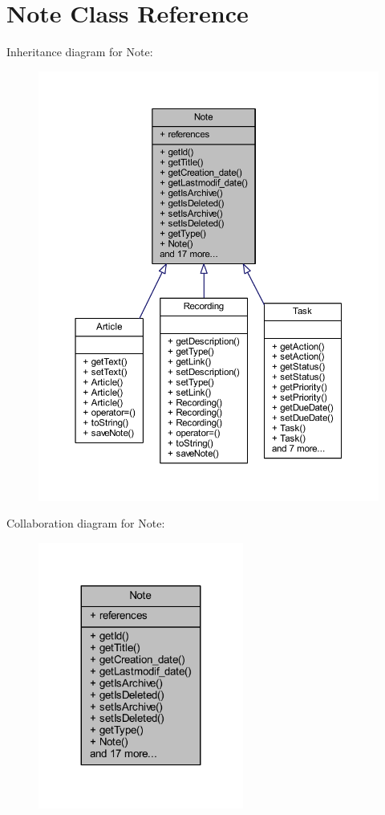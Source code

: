 \hypertarget{class_note}{}\section{Note Class Reference}
\label{class_note}


Inheritance diagram for Note\+:\nopagebreak
\begin{figure}[H]
\begin{center}
\leavevmode
\includegraphics[width=350pt]{class_note__inherit__graph}
\end{center}
\end{figure}


Collaboration diagram for Note\+:\nopagebreak
\begin{figure}[H]
\begin{center}
\leavevmode
\includegraphics[width=191pt]{class_note__coll__graph}
\end{center}
\end{figure}
